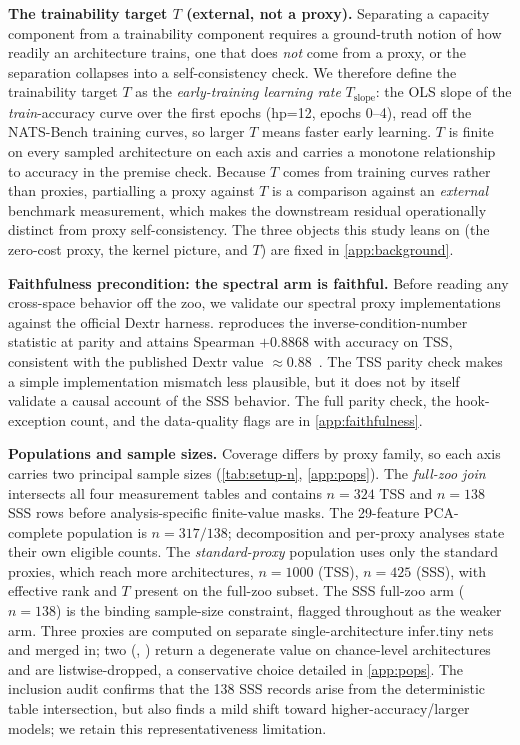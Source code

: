 \textbf{The trainability target $T$ (external, not a proxy).}
Separating a capacity component from a trainability component requires a
ground-truth notion of how readily an architecture trains, one that does
\emph{not} come from a proxy, or the separation collapses into a self-consistency
check. We therefore define the trainability target $T$ as the \emph{early-training
learning rate} $T_{\mathrm{slope}}$: the OLS slope of the \emph{train}-accuracy
curve over the first epochs (hp=12, epochs 0--4), read off the NATS-Bench training
curves, so larger $T$ means faster early learning. $T$ is finite on every sampled
architecture on each axis and carries a monotone relationship to accuracy in the
premise check. Because $T$ comes from training curves rather than proxies,
partialling a proxy against $T$ is a comparison against an \emph{external}
benchmark measurement, which makes the downstream residual operationally
distinct from proxy self-consistency. The three objects this study leans on (the
zero-cost proxy, the kernel picture, and $T$) are fixed in \cref{app:background}.

\textbf{Faithfulness precondition: the spectral arm is faithful.}
Before reading any cross-space behavior off the zoo, we validate our spectral
proxy implementations against the official Dextr harness.  reproduces the
inverse-condition-number statistic at parity and attains Spearman $+0.8868$ with
accuracy on TSS, consistent with the published Dextr value
$\approx0.88$~\cite{dextr2025}. The TSS parity check makes a simple
implementation mismatch less plausible, but it does not by itself validate a
causal account of the SSS behavior. The full parity check, the
hook-exception count, and the data-quality flags are in
\cref{app:faithfulness}.
\label{sec:setup-faithfulness}\label{sec:faithfulness}

\textbf{Populations and sample sizes.}
Coverage differs by proxy family, so each axis carries two principal sample sizes
(\cref{tab:setup-n}, \cref{app:pops}). The \emph{full-zoo join} intersects all
four measurement tables and contains $n=324$ TSS and $n=138$ SSS rows before
analysis-specific finite-value masks. The 29-feature PCA-complete population is
$n=317/138$; decomposition and per-proxy analyses state their own eligible
counts. The \emph{standard-proxy} population uses only the standard proxies, which
reach more architectures, $n=1000$ (TSS), $n=425$ (SSS), with effective rank and
$T$ present on the full-zoo subset. The SSS full-zoo arm ($n{=}138$) is the binding
sample-size constraint, flagged throughout as the weaker arm. Three proxies are
computed on separate single-architecture infer.tiny nets and merged in; two
(, ) return a degenerate value on chance-level architectures
and are listwise-dropped, a conservative choice detailed in \cref{app:pops}.
The inclusion audit confirms that the 138 SSS records arise from the
deterministic table intersection, but also finds a mild shift toward
higher-accuracy/larger models; we retain this representativeness limitation.


